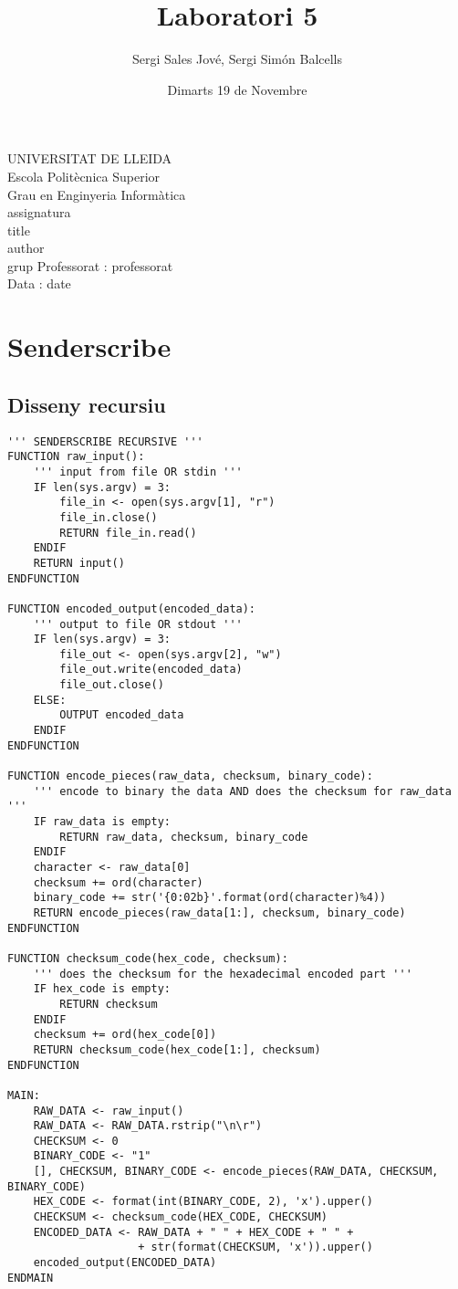 \documentclass{article}
\title{Laboratori 5}
\author{Sergi Sales Jové, Sergi Simón Balcells}
\date{Dimarts 19 de Novembre}
\renewcommand{\maketitle}{ %
    \begin{titlepage}
        \raggedright{UNIVERSITAT DE LLEIDA \\
            Escola Politècnica Superior \\
            Grau en Enginyeria Informàtica\\
            \1assignatura\\}
            \vspace{5cm}
            \centering\huge{\5title \\}
            \vspace{3cm}
            \large{\6author} \\
            \normalsize{\3grup}
            \vfill
            Professorat : \4professorat \\
            Data : \7date
\end{titlepage}}
\begin{document}
\maketitle
\thispagestyle{empty}

\newpage
{}
\tableofcontents
\newpage
{}

\section{Senderscribe}
\subsection{Disseny recursiu}
\begin{lstlisting}
''' SENDERSCRIBE RECURSIVE '''
FUNCTION raw_input():
    ''' input from file OR stdin '''
    IF len(sys.argv) = 3:
        file_in <- open(sys.argv[1], "r")
        file_in.close()
        RETURN file_in.read()
    ENDIF
    RETURN input()
ENDFUNCTION

FUNCTION encoded_output(encoded_data):
    ''' output to file OR stdout '''
    IF len(sys.argv) = 3:
        file_out <- open(sys.argv[2], "w")
        file_out.write(encoded_data)
        file_out.close()
    ELSE:
        OUTPUT encoded_data
    ENDIF
ENDFUNCTION

FUNCTION encode_pieces(raw_data, checksum, binary_code):
    ''' encode to binary the data AND does the checksum for raw_data '''
    IF raw_data is empty:
        RETURN raw_data, checksum, binary_code
    ENDIF
    character <- raw_data[0]
    checksum += ord(character)
    binary_code += str('{0:02b}'.format(ord(character)%4))
    RETURN encode_pieces(raw_data[1:], checksum, binary_code)
ENDFUNCTION

FUNCTION checksum_code(hex_code, checksum):
    ''' does the checksum for the hexadecimal encoded part '''
    IF hex_code is empty:
        RETURN checksum
    ENDIF
    checksum += ord(hex_code[0])
    RETURN checksum_code(hex_code[1:], checksum)
ENDFUNCTION

MAIN:
    RAW_DATA <- raw_input()
    RAW_DATA <- RAW_DATA.rstrip("\n\r")
    CHECKSUM <- 0
    BINARY_CODE <- "1"
    [], CHECKSUM, BINARY_CODE <- encode_pieces(RAW_DATA, CHECKSUM, BINARY_CODE)
    HEX_CODE <- format(int(BINARY_CODE, 2), 'x').upper()
    CHECKSUM <- checksum_code(HEX_CODE, CHECKSUM)
    ENCODED_DATA <- RAW_DATA + " " + HEX_CODE + " " + 
                    + str(format(CHECKSUM, 'x')).upper()
    encoded_output(ENCODED_DATA)
ENDMAIN
\end{lstlisting}
\newpage
\end{document}
